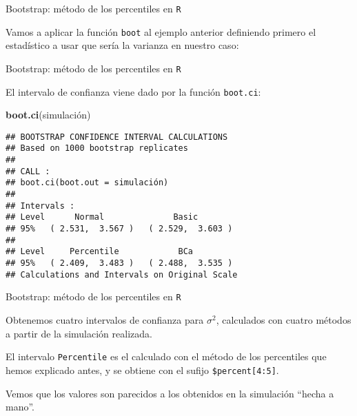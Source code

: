 \documentclass[ignorenonframetext,]{beamer}
\newenvironment{Shaded}{\begin{snugshade}}{\end{snugshade}}
\newcommand{\ControlFlowTok}[1]{\textcolor[rgb]{0.13,0.29,0.53}{\textbf{#1}}}
\newcommand{\DecValTok}[1]{\textcolor[rgb]{0.00,0.00,0.81}{#1}}
\newcommand{\KeywordTok}[1]{\textcolor[rgb]{0.13,0.29,0.53}{\textbf{#1}}}
\newcommand{\NormalTok}[1]{#1}
\newcommand{\OperatorTok}[1]{\textcolor[rgb]{0.81,0.36,0.00}{\textbf{#1}}}
\begin{document}
\begin{frame}[fragile]{Bootstrap: método de los percentiles en
\texttt{R}}
\protect\hypertarget{bootstrap-metodo-de-los-percentiles-en-r-1}{}

Vamos a aplicar la función \texttt{boot} al ejemplo anterior definiendo
primero el estadístico a usar que sería la varianza en nuestro caso:

\begin{Shaded}
\end{Shaded}

\end{frame}

\begin{frame}[fragile]{Bootstrap: método de los percentiles en
\texttt{R}}
\protect\hypertarget{bootstrap-metodo-de-los-percentiles-en-r-2}{}

El intervalo de confianza viene dado por la función \texttt{boot.ci}:

\begin{Shaded}
\begin{Highlighting}[]
\KeywordTok{boot.ci}\NormalTok{(simulación)}
\end{Highlighting}
\end{Shaded}

\begin{verbatim}
## BOOTSTRAP CONFIDENCE INTERVAL CALCULATIONS
## Based on 1000 bootstrap replicates
## 
## CALL : 
## boot.ci(boot.out = simulación)
## 
## Intervals : 
## Level      Normal              Basic         
## 95%   ( 2.531,  3.567 )   ( 2.529,  3.603 )  
## 
## Level     Percentile            BCa          
## 95%   ( 2.409,  3.483 )   ( 2.488,  3.535 )  
## Calculations and Intervals on Original Scale
\end{verbatim}

\end{frame}

\begin{frame}[fragile]{Bootstrap: método de los percentiles en
\texttt{R}}
\protect\hypertarget{bootstrap-metodo-de-los-percentiles-en-r-3}{}

Obtenemos cuatro intervalos de confianza para \(\sigma^2\), calculados
con cuatro métodos a partir de la simulación realizada.

El intervalo \texttt{Percentile} es el calculado con el método de los
percentiles que hemos explicado antes, y se obtiene con el sufijo
\texttt{\$percent{[}4:5{]}}.

Vemos que los valores son parecidos a los obtenidos en la simulación
``hecha a mano''.

\end{frame}
\end{document}
